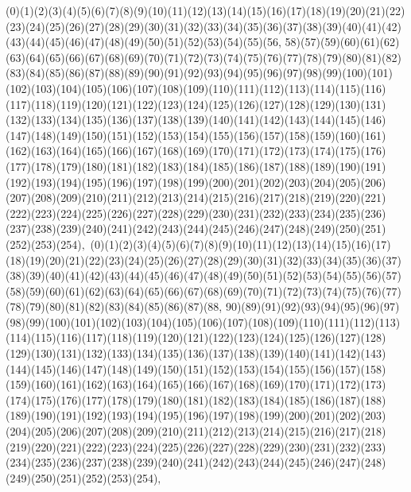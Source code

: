 \documentclass[12pt]{article}
\begin{document}
{(0)(1)(2)(3)(4)(5)(6)(7)(8)(9)(10)(11)(12)(13)(14)(15)(16)(17)(18)(19)(20)(21)(22)(23)(24)(25)(26)(27)(28)(29)(30)(31)(32)(33)(34)(35)(36)(37)(38)(39)(40)(41)(42)(43)(44)(45)(46)(47)(48)(49)(50)(51)(52)(53)(54)(55)(56, 58)(57)(59)(60)(61)(62)(63)(64)(65)(66)(67)(68)(69)(70)(71)(72)(73)(74)(75)(76)(77)(78)(79)(80)(81)(82)(83)(84)(85)(86)(87)(88)(89)(90)(91)(92)(93)(94)(95)(96)(97)(98)(99)(100)(101)(102)(103)(104)(105)(106)(107)(108)(109)(110)(111)(112)(113)(114)(115)(116)(117)(118)(119)(120)(121)(122)(123)(124)(125)(126)(127)(128)(129)(130)(131)(132)(133)(134)(135)(136)(137)(138)(139)(140)(141)(142)(143)(144)(145)(146)(147)(148)(149)(150)(151)(152)(153)(154)(155)(156)(157)(158)(159)(160)(161)(162)(163)(164)(165)(166)(167)(168)(169)(170)(171)(172)(173)(174)(175)(176)(177)(178)(179)(180)(181)(182)(183)(184)(185)(186)(187)(188)(189)(190)(191)(192)(193)(194)(195)(196)(197)(198)(199)(200)(201)(202)(203)(204)(205)(206)(207)(208)(209)(210)(211)(212)(213)(214)(215)(216)(217)(218)(219)(220)(221)(222)(223)(224)(225)(226)(227)(228)(229)(230)(231)(232)(233)(234)(235)(236)(237)(238)(239)(240)(241)(242)(243)(244)(245)(246)(247)(248)(249)(250)(251)(252)(253)(254)$
, 
$
(0)(1)(2)(3)(4)(5)(6)(7)(8)(9)(10)(11)(12)(13)(14)(15)(16)(17)(18)(19)(20)(21)(22)(23)(24)(25)(26)(27)(28)(29)(30)(31)(32)(33)(34)(35)(36)(37)(38)(39)(40)(41)(42)(43)(44)(45)(46)(47)(48)(49)(50)(51)(52)(53)(54)(55)(56)(57)(58)(59)(60)(61)(62)(63)(64)(65)(66)(67)(68)(69)(70)(71)(72)(73)(74)(75)(76)(77)(78)(79)(80)(81)(82)(83)(84)(85)(86)(87)(88, 90)(89)(91)(92)(93)(94)(95)(96)(97)(98)(99)(100)(101)(102)(103)(104)(105)(106)(107)(108)(109)(110)(111)(112)(113)(114)(115)(116)(117)(118)(119)(120)(121)(122)(123)(124)(125)(126)(127)(128)(129)(130)(131)(132)(133)(134)(135)(136)(137)(138)(139)(140)(141)(142)(143)(144)(145)(146)(147)(148)(149)(150)(151)(152)(153)(154)(155)(156)(157)(158)(159)(160)(161)(162)(163)(164)(165)(166)(167)(168)(169)(170)(171)(172)(173)(174)(175)(176)(177)(178)(179)(180)(181)(182)(183)(184)(185)(186)(187)(188)(189)(190)(191)(192)(193)(194)(195)(196)(197)(198)(199)(200)(201)(202)(203)(204)(205)(206)(207)(208)(209)(210)(211)(212)(213)(214)(215)(216)(217)(218)(219)(220)(221)(222)(223)(224)(225)(226)(227)(228)(229)(230)(231)(232)(233)(234)(235)(236)(237)(238)(239)(240)(241)(242)(243)(244)(245)(246)(247)(248)(249)(250)(251)(252)(253)(254)$
, 
$
}
\end{document}
